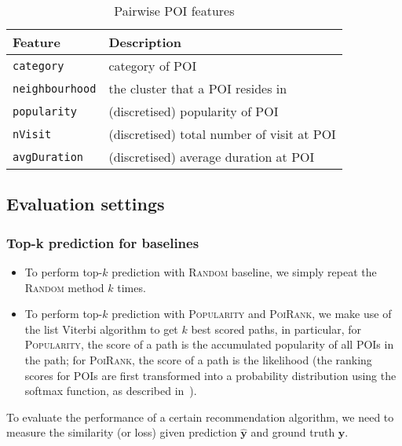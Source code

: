 \begin{table}[!h]
\centering
\small
\setlength{\tabcolsep}{2pt} %
\begin{tabular}{l|l} \hline
\textbf{Feature}       & \textbf{Description} \\ \hline
\texttt{category}      & category of POI \\
\texttt{neighbourhood} & the cluster that a POI resides in \\
\texttt{popularity}    & (discretised) popularity of POI \\
\texttt{nVisit}        & (discretised) total number of visit at POI \\
\texttt{avgDuration}  & (discretised) average duration at POI \\ \hline
\end{tabular}
\caption{Pairwise POI features}
\label{tab:tranfeature}
\end{table}


\subsection{Evaluation settings}
\label{sec:metric}

\subsubsection{Top-k prediction for baselines}
\begin{itemize}
\item To perform top-$k$ prediction with \textsc{Random} baseline, we simply repeat the \textsc{Random} method $k$ times.
\item To perform top-$k$ prediction with \textsc{Popularity} and \textsc{PoiRank}, we make use of the list Viterbi algorithm 
      to get $k$ best scored paths, in particular, 
      for \textsc{Popularity}, the score of a path is the accumulated popularity of all POIs in the path; 
      for \textsc{PoiRank}, the score of a path is the likelihood 
      (the ranking scores for POIs are first transformed into a probability distribution using the softmax function, as described in~\cite{cikm16paper}).
\end{itemize}

To evaluate the performance of a certain recommendation algorithm,
we need to measure the similarity (or loss) given prediction $\hat{\mathbf{y}}$
and ground truth $\mathbf{y}$.


